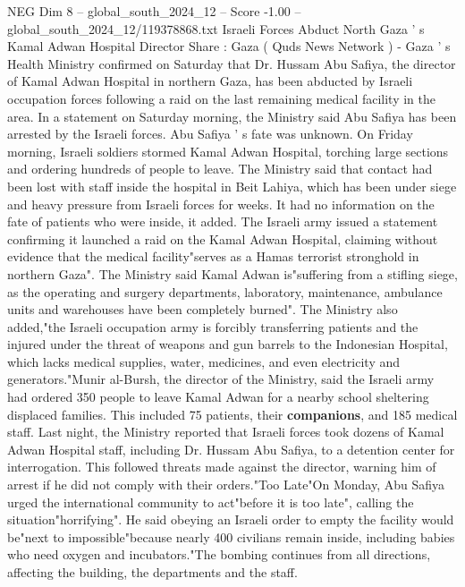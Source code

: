 \begin{textsample}{NEG Dim 8 – global\_south\_2024\_12 – Score -1.00 – global\_south\_2024\_12/119378868.txt}  \label{ex:f8_neg_104}
Israeli Forces Abduct North Gaza ' s Kamal Adwan Hospital Director Share : Gaza ( Quds News Network ) - Gaza ' s Health Ministry confirmed on Saturday that Dr.
Hussam Abu Safiya, the director of Kamal Adwan Hospital in northern Gaza, has been abducted by Israeli occupation forces following a raid on the last remaining medical facility in the area.
In a statement on Saturday morning, the Ministry said Abu Safiya has been arrested by the Israeli forces.
Abu Safiya ' s fate was unknown.
On Friday morning, Israeli soldiers stormed Kamal Adwan Hospital, torching large sections and ordering hundreds of people to leave.
The Ministry said that contact had been lost with staff inside the hospital in Beit Lahiya, which has been under siege and heavy pressure from Israeli forces for weeks.
It had no information on the fate of patients who were inside, it added.
The Israeli army issued a statement confirming it launched a raid on the Kamal Adwan Hospital, claiming without evidence that the medical facility"serves as a Hamas terrorist stronghold in northern Gaza".
The Ministry said Kamal Adwan is"suffering from a stifling siege, as the operating and surgery departments, laboratory, maintenance, ambulance units and warehouses have been completely burned".
The Ministry also added,"the Israeli occupation army is forcibly transferring patients and the injured under the threat of weapons and gun barrels to the Indonesian Hospital, which lacks medical supplies, water, medicines, and even electricity and generators."Munir al-Bursh, the director of the Ministry, said the Israeli army had ordered 350 people to leave Kamal Adwan for a nearby school sheltering displaced families.
This included 75 patients, their \textbf{companions}, and 185 medical staff.
Last night, the Ministry reported that Israeli forces took dozens of Kamal Adwan Hospital staff, including Dr.
Hussam Abu Safiya, to a detention center for interrogation.
This followed threats made against the director, warning him of arrest if he did not comply with their orders."Too Late"On Monday, Abu Safiya urged the international community to act"before it is too late", calling the situation"horrifying".
He said obeying an Israeli order to empty the facility would be"next to impossible"because nearly 400 civilians remain inside, including babies who need oxygen and incubators."The bombing continues from all directions, affecting the building, the departments and the staff.

\end{textsample}
